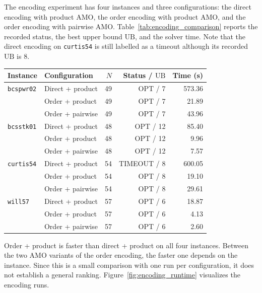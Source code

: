 \documentclass[a4paper,fleqn]{cas-sc}
\begin{document}
        The encoding experiment has four instances and three configurations: the direct encoding with product AMO, the order encoding with product AMO, and the order encoding with pairwise AMO. Table~\ref{tab:encoding_comparison} reports the recorded status, the best upper bound $\text{UB}$, and the solver time. Note that the direct encoding on \texttt{curtis54} is still labelled as a timeout although its recorded $\text{UB}$ is 8.

        \begin{center}
        \centering
        \small
        \label{tab:encoding_comparison}
        \begin{tabular}{llrrr}
        \toprule
        Instance & Configuration & $N$ & Status / $\text{UB}$ & Time (s) \\
        \midrule
        \texttt{bcspwr02} & Direct + product & 49 & OPT / 7 & 573.36 \\
        & Order + product & 49 & OPT / 7 & 21.89 \\
        & Order + pairwise & 49 & OPT / 7 & 43.96 \\
        \texttt{bcsstk01} & Direct + product & 48 & OPT / 12 & 85.40 \\
        & Order + product & 48 & OPT / 12 & 9.96 \\
        & Order + pairwise & 48 & OPT / 12 & 7.57 \\
        \texttt{curtis54} & Direct + product & 54 & TIMEOUT / 8 & 600.05 \\
        & Order + product & 54 & OPT / 8 & 19.10 \\
        & Order + pairwise & 54 & OPT / 8 & 29.61 \\
        \texttt{will57} & Direct + product & 57 & OPT / 6 & 18.87 \\
        & Order + product & 57 & OPT / 6 & 4.13 \\
        & Order + pairwise & 57 & OPT / 6 & 2.60 \\
        \bottomrule
        \end{tabular}
        \end{center}

        Order + product is faster than direct + product on all four instances. Between the two AMO variants of the order encoding, the faster one depends on the instance. Since this is a small comparison with one run per configuration, it does not establish a general ranking. Figure~\ref{fig:encoding_runtime} visualizes the encoding runs.
\end{document}
